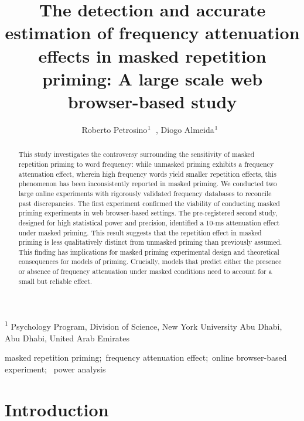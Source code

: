 \documentclass[
]{interact}
\title{The detection and accurate estimation of frequency attenuation
effects in masked repetition priming: A large scale web browser-based
study}
\author{Roberto
Petrosino$\textsuperscript{1}$~\orcidlink{0000-0002-8502-3070}, Diogo
Almeida$\textsuperscript{1}$~\orcidlink{0000-0003-4674-8092}}
\begin{document}
\captionsetup{labelsep=space}
\maketitle
\textsuperscript{1} Psychology Program, Division of Science, New York
University Abu Dhabi, Abu Dhabi, United Arab Emirates
\begin{abstract}
This study investigates the controversy surrounding the sensitivity of
masked repetition priming to word frequency: while unmasked priming
exhibits a frequency attenuation effect, wherein high frequency words
yield smaller repetition effects, this phenomenon has been
inconsistently reported in masked priming. We conducted two large online
experiments with rigorously validated frequency databases to reconcile
past discrepancies. The first experiment confirmed the viability of
conducting masked priming experiments in web browser-based settings. The
pre-registered second study, designed for high statistical power and
precision, identified a 10-ms attenuation effect under masked priming.
This result suggests that the repetition effect in masked priming is
less qualitatively distinct from unmasked priming than previously
assumed. This finding has implications for masked priming experimental
design and theoretical consequences for models of priming. Crucially,
models that predict either the presence or absence of frequency
attenuation under masked conditions need to account for a small but
reliable effect.
\end{abstract}
\begin{keywords}
\def\sep{;\ }
masked repetition priming\sep frequency attenuation effect\sep online
browser-based experiment\sep 
power analysis
\end{keywords}

\section{Introduction}\label{sec-intro}
\end{document}
